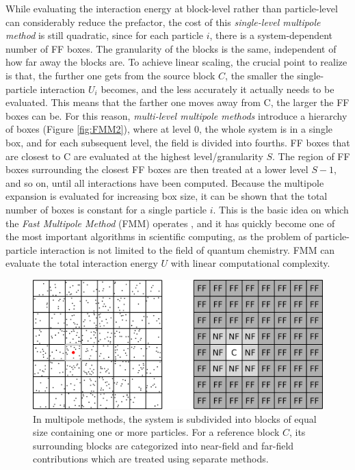 \noindent While evaluating the interaction energy at block-level rather than particle-level can considerably reduce the prefactor, the cost of this \emph{single-level multipole method} is still quadratic, since for each particle $i$, there is a system-dependent number of FF boxes. The granularity of the blocks is the same, independent of how far away the blocks are. To achieve linear scaling, the crucial point to realize is that, the further one gets from the source block $C$, the smaller the single-particle interaction $U_i$ becomes, and the less accurately it actually needs to be evaluated. This means that the farther one moves away from C, the larger the FF boxes can be. For this reason, \emph{multi-level multipole methods} introduce a hierarchy of boxes (Figure \ref{fig:FMM2}), where at level 0, the whole system is in a single box, and for each subsequent level, the field is divided into fourths. FF boxes that are closest to C are evaluated at the highest level/granularity $S$. The region of FF boxes surrounding the closest FF boxes are then treated at a lower level $S-1$, and so on, until all interactions have been computed. Because the multipole expansion is evaluated for increasing box size, it can be shown that the total number of boxes is constant for a single particle $i$. This is the basic idea on which the \emph{Fast Multipole Method} (FMM) operates \cite{Gre1987,Gre1994,Din1992}, and it has quickly become one of the most important algorithms in scientific computing, as the problem of particle-particle interaction is not limited to the field of quantum chemistry. FMM can evaluate the total interaction energy $U$ with linear computational complexity.

\begin{figure}
\centering
\includegraphics[scale=0.35]{Pics/FMM1}
\caption[Single-level multipole method]{In multipole methods, the system is subdivided into blocks of equal size containing one or more particles. For a reference block $C$, its surrounding blocks are categorized into near-field and far-field contributions which are treated using separate methods.}
\label{fig:FMM1}
\end{figure}

